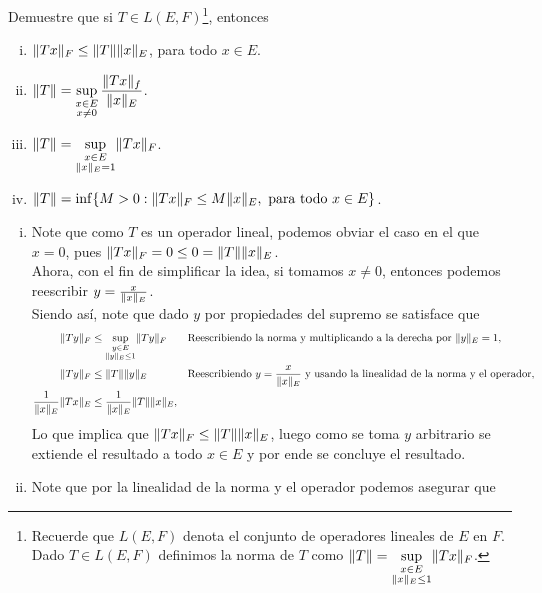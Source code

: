 \begin{homeworkProblem}
  Demuestre que si $T\in L(E,F)$\footnote{Recuerde que $L(E,F)$ denota el conjunto de operadores lineales de $E$ en $F$. Dado $T\in L(E,F)$ definimos la norma de $T$ como $\displaystyle \lVert T\rVert = \sup_{\substack{x \in E \\ \lVert x\rVert_E \leq 1}} \lVert Tx\rVert_F$.}, entonces
  \begin{enumerate}[(i)]
    \item $\lVert Tx\rVert_{F}\leq \lVert T\rVert\lVert x\rVert_{E}$, para todo $x\in E$.
    \item $\displaystyle \lVert T\rVert = \sup_{\substack{x \in E \\ x\neq 0}} \frac{\lVert Tx\rVert_{f}}{\lVert x\rVert_{E}}$.
    \item $\displaystyle \lVert T\rVert = \sup_{\substack{x \in E \\ \lVert x\rVert_E = 1}} \lVert Tx\rVert_F$.
    \item $\lVert T\rVert=\inf\{M>0:\lVert Tx\rVert_{F}\leq M\lVert x\rVert_{E}, \text{ para todo }x\in E\}$.
  \end{enumerate}
  \begin{solution}
    \begin{enumerate}[(i)]
      \item Note que como $T$ es un operador lineal, podemos obviar el caso en el que $x=0$, pues $\lVert Tx\rVert_{F}=0\leq 0=\lVert T\rVert\lVert x\rVert_{E}$.\\
        Ahora, con el fin de simplificar la idea, si tomamos $x\neq 0$, entonces podemos reescribir $y=\frac{x}{\lVert x\rVert_{E}}$.\\
        Siendo así, note que dado $y$ por propiedades del supremo se satisface que
        \begin{align*}
          \lVert Ty\rVert_{F}&\leq \sup_{\substack{y\in E\\ \lVert y\rVert_{E}\leq 1}}\lVert Ty\rVert_{F} &&\text{Reescribiendo la norma y multiplicando a la derecha por $\lVert y\rVert_{E}=1$,}\\
          \lVert Ty\rVert_{F}&\leq \lVert T\rVert\lVert y\rVert_{E} &&\text{Reescribiendo $y=\frac{x}{\lVert x\rVert_{E}}$ y usando la linealidad de la norma y el operador,}\\
          \frac{1}{\lVert x\rVert_{E}}\lVert Tx\rVert_{E}&\leq \frac{1}{\lVert x\rVert_{E}}\lVert T\rVert\lVert x\rVert_{E},
        \end{align*}
        Lo que implica que $\lVert Tx\rVert_{F}\leq \lVert T\rVert\lVert x\rVert_{E}$, luego como se toma $y$ arbitrario se extiende el resultado a todo $x\in E$ y por ende se concluye el resultado.
      \item Note que por la linealidad de la norma y el operador podemos asegurar que

\end{enumerate}
\end{solution}
\end{homeworkProblem}
